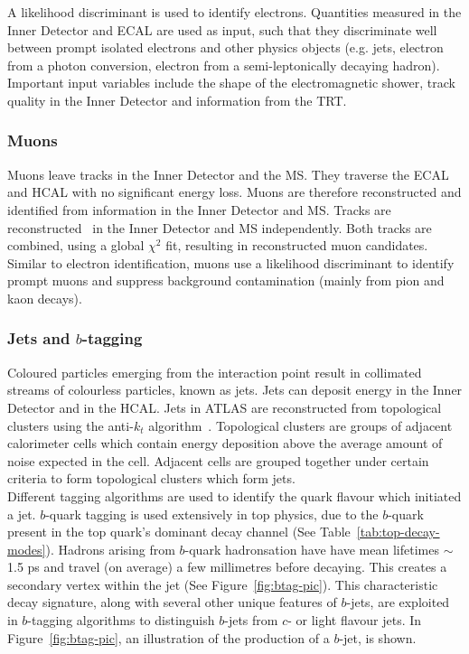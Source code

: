 A likelihood discriminant is used to identify electrons. Quantities measured in the Inner Detector and ECAL are used as input, such that they discriminate well between prompt isolated electrons and other physics objects (e.g. jets, electron from a photon conversion, electron from a semi-leptonically decaying hadron). Important input variables include the shape of the electromagnetic shower, track quality in the Inner Detector and information from the TRT.

\subsubsection{Muons}
Muons leave tracks in the Inner Detector and the MS. They traverse the ECAL and HCAL with no significant energy loss. Muons are therefore reconstructed and identified from information in the Inner Detector and MS. Tracks are reconstructed~\cite{muonIDEfficiency} in the Inner Detector and MS independently. Both tracks are combined, using a global $\chi^{2}$ fit, resulting in reconstructed muon candidates.\\

Similar to electron identification, muons use a likelihood discriminant to identify prompt muons and suppress background contamination (mainly from pion and kaon decays).

\subsubsection{Jets and $b$-tagging}
\label{sec:jets-btagging}
Coloured particles emerging from the interaction point result in collimated streams of colourless particles, known as jets. Jets can deposit energy in the Inner Detector and in the HCAL. Jets in ATLAS are reconstructed from topological clusters using the anti-$k_{t}$ algorithm~\cite{Cacciari:2008gp}. Topological clusters are groups of adjacent calorimeter cells which contain energy deposition above the average amount of noise expected in the cell. Adjacent cells are grouped together under certain criteria to form topological clusters which form jets.\\

Different tagging algorithms are used to identify the quark flavour which initiated a jet. $b$-quark tagging is used extensively in top physics, due to the $b$-quark present in the top quark's dominant decay channel (See Table~\ref{tab:top-decay-modes}). Hadrons arising from $b$-quark hadronsation have have mean lifetimes $\sim$1.5 ps and travel (on average) a few millimetres before decaying. This creates a secondary vertex within the jet (See Figure~\ref{fig:btag-pic}). This characteristic decay signature, along with several other unique features of $b$-jets, are exploited in $b$-tagging algorithms to distinguish $b$-jets from $c$- or light flavour jets. In Figure~\ref{fig:btag-pic}, an illustration of the production of a $b$-jet, is shown.

